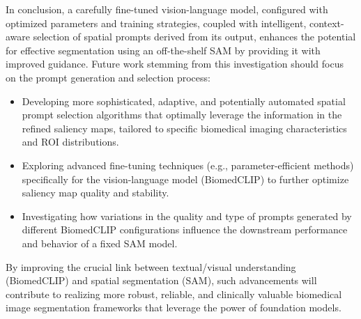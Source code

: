 \documentclass[./dissertation.tex]{subfiles}
\begin{document}
In conclusion, a carefully fine-tuned vision-language model, configured with optimized parameters and training strategies, coupled with intelligent, context-aware selection of spatial prompts derived from its output, enhances the potential for effective segmentation using an off-the-shelf SAM by providing it with improved guidance. Future work stemming from this investigation should focus on the prompt generation and selection process:
\begin{itemize}
    \item Developing more sophisticated, adaptive, and potentially automated spatial prompt selection algorithms that optimally leverage the information in the refined saliency maps, tailored to specific biomedical imaging characteristics and ROI distributions.
    \item Exploring advanced fine-tuning techniques (e.g., parameter-efficient methods) specifically for the vision-language model (BiomedCLIP) to further optimize saliency map quality and stability.
    \item Investigating how variations in the quality and type of prompts generated by different BiomedCLIP configurations influence the downstream performance and behavior of a fixed SAM model.

\end{itemize}
By improving the crucial link between textual/visual understanding (BiomedCLIP) and spatial segmentation (SAM), such advancements will contribute to realizing more robust, reliable, and clinically valuable biomedical image segmentation frameworks that leverage the power of foundation models.



\end{document}
